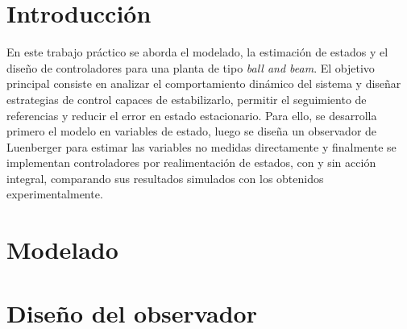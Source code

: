 \documentclass[a4paper,12pt]{article}
\begin{document}
\vspace{2em}
\thispagestyle{empty}

\begin{abstract}
En este trabajo práctico se estudia el modelado, observación y control de una planta \textit{ball and beam}. A partir del modelo en variables de estado se diseña un observador de Luenberger y se implementan distintas estrategias de control por realimentación de estados: estabilización alrededor del equilibrio, seguimiento de referencias mediante acción de \textit{feed-forward} y seguimiento con acción integral. Los resultados experimentales se comparan con simulaciones para evaluar el desempeño real del sistema, prestando especial atención al error en estado estacionario, el sobrepico, el tiempo de establecimiento y las limitaciones introducidas por el rozamiento, el ruido de medición y la dinámica mecánica de la planta.
\end{abstract}

\newpage

\tableofcontents

\newpage

\section{Introducción}

En este trabajo práctico se aborda el modelado, la estimación de estados y el diseño de controladores para una planta de tipo \textit{ball and beam}. El objetivo principal consiste en analizar el comportamiento dinámico del sistema y diseñar estrategias de control capaces de estabilizarlo, permitir el seguimiento de referencias y reducir el error en estado estacionario. Para ello, se desarrolla primero el modelo en variables de estado, luego se diseña un observador de Luenberger para estimar las variables no medidas directamente y finalmente se implementan controladores por realimentación de estados, con y sin acción integral, comparando sus resultados simulados con los obtenidos experimentalmente.

\section{Modelado}


\section{Diseño del observador}

\end{document}
